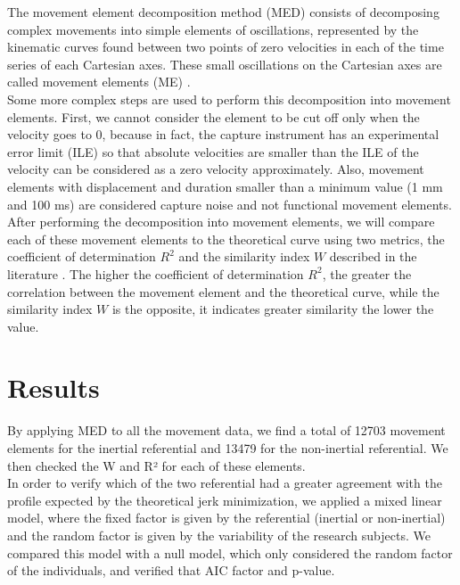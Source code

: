 \documentclass{article}
\begin{document}
The movement element decomposition method (MED) consists of decomposing complex movements into simple elements of oscillations, represented by the kinematic curves found between two points of zero velocities in each of the time series of each Cartesian axes. These small oscillations on the Cartesian axes are called movement elements (ME) \cite{miranda}.
\\

Some more complex steps are used to perform this decomposition into movement elements. First, we cannot consider the element to be cut off only when the velocity goes to 0, because in fact, the capture instrument has an experimental error limit (ILE) so that absolute velocities are smaller than the ILE of the velocity can be considered as a zero velocity approximately. Also, movement elements with displacement and duration smaller than a minimum value (1 mm and 100 ms) are considered capture noise and not functional movement elements.
\\

After performing the decomposition into movement elements, we will compare each of these movement elements to the theoretical \cite{hogan, hoff} curve using two metrics, the coefficient of determination \(R^2\) and the similarity index \(W\) described in the literature \cite{delemos}. The higher the coefficient of determination \(R^2\), the greater the correlation between the movement element and the theoretical curve, while the similarity index \(W\) is the opposite, it indicates greater similarity the lower the value.

\section{Results}

By applying MED to all the movement data, we find a total of 12703 movement elements for the inertial referential and 13479 for the non-inertial referential. We then checked the W and R² for each of these elements.
\\

In order to verify which of the two referential had a greater agreement with the profile expected by the theoretical jerk minimization, we applied a mixed linear model, where the fixed factor is given by the referential (inertial or non-inertial) and the random factor is given by the variability of the research subjects. We compared this model with a null model, which only considered the random factor of the individuals, and verified that AIC factor and p-value. 
\\
\end{document}
